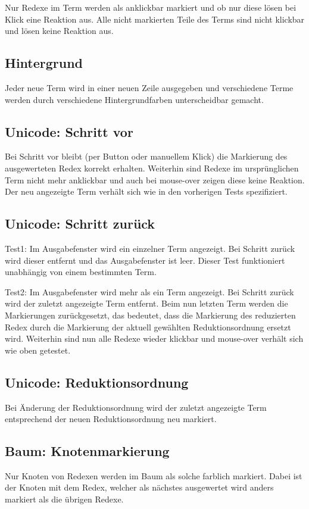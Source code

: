 \documentclass[parskip=full,11pt,openany]{scrreprt}
\begin{document}
Nur Redexe im  Term werden als anklickbar markiert und ob nur diese lösen bei Klick eine Reaktion aus. Alle nicht markierten Teile des Terms sind nicht klickbar und lösen keine Reaktion aus. %

\subsection{Hintergrund}
Jeder neue Term wird in einer neuen Zeile ausgegeben und verschiedene Terme werden durch verschiedene Hintergrundfarben unterscheidbar gemacht.


\subsection{Unicode: Schritt vor}
Bei Schritt vor bleibt (per Button oder manuellem Klick) die Markierung des ausgewerteten Redex korrekt erhalten. Weiterhin sind Redexe im ursprünglichen Term nicht mehr anklickbar und auch bei mouse-over zeigen diese keine Reaktion. Der neu angezeigte Term verhält sich wie in den vorherigen Tests spezifiziert.

\subsection{Unicode: Schritt zurück}
Test1: 
Im Ausgabefenster wird ein einzelner Term angezeigt. Bei Schritt zurück wird dieser entfernt und das Ausgabefenster ist leer. 
Dieser Test funktioniert unabhängig von einem bestimmten Term.

Test2: 
Im Ausgabefenster wird mehr als ein Term angezeigt. Bei Schritt zurück wird der zuletzt angezeigte Term entfernt.
Beim nun letzten Term werden die Markierungen zurückgesetzt, das bedeutet, dass die Markierung des reduzierten Redex durch die Markierung der aktuell gewählten Reduktionsordnung ersetzt wird. Weiterhin sind nun alle Redexe wieder klickbar und mouse-over verhält sich wie oben getestet.

\subsection{Unicode: Reduktionsordnung}
Bei Änderung der Reduktionsordnung wird der zuletzt angezeigte Term entsprechend der neuen Reduktionsordnung neu markiert. 

\subsection{Baum: Knotenmarkierung}
Nur Knoten von Redexen werden im Baum als solche farblich markiert. Dabei ist der Knoten mit dem Redex, welcher als nächstes ausgewertet wird anders markiert als die übrigen Redexe.
\end{document}
